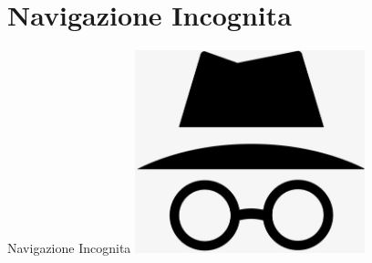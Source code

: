\section{Navigazione Incognita}
\begin{frame}{Navigazione Incognita}
	\centering
	\includegraphics[width=0.50\textwidth]{navinc}
\end{frame}